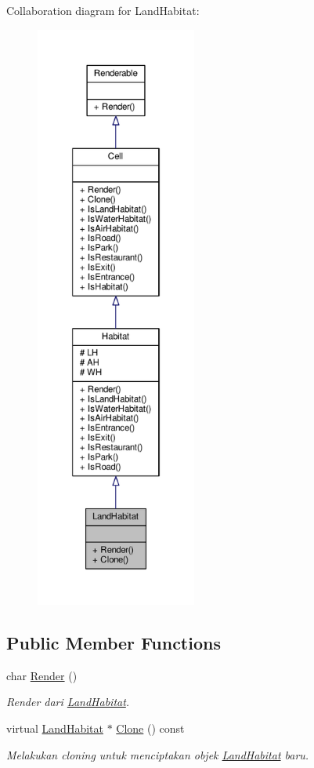 Collaboration diagram for Land\+Habitat\+:
\nopagebreak
\begin{figure}[H]
\begin{center}
\leavevmode
\includegraphics[height=550pt]{classLandHabitat__coll__graph}
\end{center}
\end{figure}
\subsection*{Public Member Functions}
\begin{DoxyCompactItemize}
\item 
char \hyperlink{classLandHabitat_ad2147498f493b01429ae315f0145d3a9}{Render} ()
\begin{DoxyCompactList}\small\item\em Render dari \hyperlink{classLandHabitat}{Land\+Habitat}. \end{DoxyCompactList}\item 
virtual \hyperlink{classLandHabitat}{Land\+Habitat} $\ast$ \hyperlink{classLandHabitat_a8cd927afc8d52a9fb8cdc5701893ad81}{Clone} () const 
\begin{DoxyCompactList}\small\item\em Melakukan cloning untuk menciptakan objek \hyperlink{classLandHabitat}{Land\+Habitat} baru. \end{DoxyCompactList}\end{DoxyCompactItemize}
